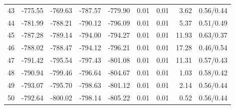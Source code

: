 \begin{tabular}{lrrrrrrrr}
43 & -775.55 & -769.63 & -787.57 & -779.90 & 0.01 & 0.01 & 3.62 & 0.56/0.44 \\
44 & -781.99 & -788.21 & -790.12 & -796.09 & 0.01 & 0.01 & 5.37 & 0.51/0.49 \\
45 & -787.28 & -789.14 & -794.00 & -794.27 & 0.01 & 0.01 & 11.93 & 0.63/0.37 \\
46 & -788.02 & -788.47 & -794.12 & -796.21 & 0.01 & 0.01 & 17.28 & 0.46/0.54 \\
47 & -791.42 & -795.54 & -797.43 & -801.08 & 0.01 & 0.01 & 11.31 & 0.57/0.43 \\
48 & -790.94 & -799.46 & -796.64 & -804.67 & 0.01 & 0.01 & 1.03 & 0.58/0.42 \\
49 & -793.07 & -795.70 & -798.63 & -801.12 & 0.01 & 0.01 & 2.14 & 0.56/0.44 \\
50 & -792.64 & -800.02 & -798.14 & -805.22 & 0.01 & 0.01 & 0.52 & 0.56/0.44 \\
\hline
\end{tabular}
